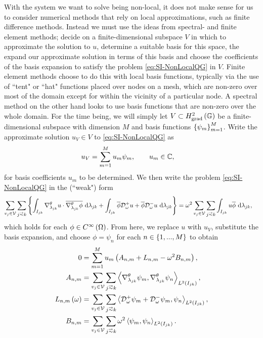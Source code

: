 With the system we want to solve being non-local, it does not make sense for us to consider numerical methods that rely on local approximations, such as finite difference methods.
Instead we must use the ideas from spectral- and finite element methods; decide on a finite-dimensional subspace $V$ in which to approximate the solution to $u$, determine a suitable basis for this space, the expand our approximate solution in terms of this basis and choose the coefficients of the basis expansion to satisfy the problem \eqref{eq:SI-NonLocalQG} in $V$.
Finite element methods choose to do this with local basis functions, typically via the use of ``tent" or ``hat" functions placed over nodes on a mesh, which are non-zero over most of the domain except for within the vicinity of a particular node.
A spectral method on the other hand looks to use basis functions that are non-zero over the whole domain.
For the time being, we will simply let $V\subset H^2_\mathrm{grad}\left( \mathbb{G} \right)$ be a finite-dimensional subspace with dimension $M$ and basis functions $\left\{ \psi_m \right\}_{m=1}^{M}$.
Write the approximate solution $u_V\in V$ to \eqref{eq:SI-NonLocalQG} as
\begin{align*}
	u_V &= \sum_{m=1}^M u_m\psi_m, \qquad u_m\in\mathbb{C},
\end{align*}
for basis coefficients $u_m$ to be determined.
We then write the problem \eqref{eq:SI-NonLocalQG} in the (``weak") form
\begin{align*}
	\sum_{v_j\in\vertSet}\sum_{j\conLeft k} 
	\clbracs{ 
	\integral{I_{jk}}{\tgrad_{\lambda_{jk}}u\cdot\overline{\tgrad_{\lambda_{jk}}\phi}}{\lambda_{jk}} 
	+ \integral{I_{jk}}{\overline{\phi}\dtn^+_{\omega}u + \overline{\phi}\dtn^-_{\omega}u}{\lambda_{jk}} 
	}
	&= \omega^2 \sum_{v_j\in\vertSet}\sum_{j\conLeft k}\integral{I_{jk}}{u\overline{\phi}}{\lambda_{jk}},
\end{align*}
which holds for each $\phi\in C^{\infty}\left( \Omega \right)$.
From here, we replace $u$ with $u_V$, substitute the basis expansion, and choose $\phi=\psi_n$ for each $n\in\left\{ 1,...,M \right\}$ to obtain
\begin{align*}
	0 &= 
	\sum_{m=1}^{M} u_m \bracs{ A_{n,m} + L_{n,m} - \omega^2 B_{n,m} }, \\
	A_{n,m} &= \sum_{v_j\in\vertSet}\sum_{j\conLeft k} \ip{\tgrad_{\lambda_{jk}}\psi_m}{\tgrad_{\lambda_{jk}}\psi_n}_{L^2\bracs{I_{jk}}}, \\
	L_{n,m}\bracs{\omega} &= \sum_{v_j\in\vertSet}\sum_{j\conLeft k} \ip{\dtn^+_{\omega}\psi_m + \dtn^-_{\omega}\psi_m}{\psi_n}_{L^2\bracs{I_{jk}}}, \\
	B_{n,m} &= \sum_{v_j\in\vertSet}\sum_{j\conLeft k} \omega^2\ip{\psi_m}{\psi_n}_{L^2\bracs{I_{jk}}}.
\end{align*}
